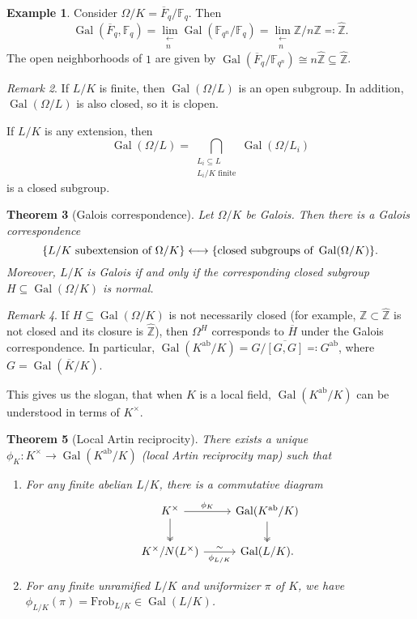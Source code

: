 \documentclass[leqno, openany]{memoir}
\newtheorem{thm}{Theorem}[section]
\theoremstyle{definition}
\newtheorem{exm}[thm]{Example}
\theoremstyle{remark}
\newtheorem{rmk}[thm]{Remark}
\theoremstyle{plain}
\theoremstyle{definition}
\theoremstyle{remark}
\newcommand{\F}{\mathbb{F}}
\newcommand{\Z}{\mathbb{Z}}
\newcommand{\mr}[1]{\mathrm{#1}}
\newcommand{\ol}[1]{\overline{#1}}
\newcommand{\wh}[1]{\widehat{#1}}
\DeclareMathOperator{\Gal}{Gal}
\begin{document}
\begin{exm} Consider $\Omega / K = \ol{F}_q / \F_q$. Then \[ \Gal(\ol{F}_q,
\F_q) = \lim_{\substack{\longleftarrow \\ n}} \Gal(\F_{q^n} / \F_q) =
\lim_{\substack{\longleftarrow \\ n}} \Z/n\Z \eqqcolon \wh{\Z}. \] The open
neighborhoods of $1$ are given by $\Gal(\ol{F}_q / \F_{q^n}) \cong n \wh{\Z}
\subseteq \wh{\Z}$.  \end{exm}

\begin{rmk} If $L/K$ is finite, then $\Gal(\Omega / L)$ is an open subgroup. In
    addition, $\Gal(\Omega / L)$ is also closed, so it is clopen.

    If $L/K$ is any extension, then \[ \Gal(\Omega / L) =
    \bigcap_{\substack{L_i \subseteq L \\ L_i/K \text{ finite}}} \Gal(\Omega /
L_i) \] is a closed subgroup.  \end{rmk}

\begin{thm}[Galois correspondence] Let $\Omega / K$ be Galois. Then there is a
    Galois correspondence \[ \qty{L/K \text{ subextension of }\Omega /K}
    \longleftrightarrow \qty{\text{closed subgroups of } \Gal(\Omega/K)}. \]
    Moreover, $L/K$ is Galois if and only if the corresponding closed subgroup
    $H \subseteq \Gal(\Omega /K)$ is normal.  \end{thm}

\begin{rmk} If $H \subseteq \Gal(\Omega /K)$ is not necessarily closed (for
    example, $\Z \subset \wh{\Z}$ is not closed and its closure is $\wh{\Z}$),
    then $\Omega^H$ corresponds to $\ol{H}$ under the Galois correspondence. In
    particular, $\Gal(K^{\mr{ab}}/K) = G/\ol{[G,G]} \eqqcolon G^{\mr{ab}}$,
    where $G = \Gal(\ol{K} / K)$.

    This gives us the slogan, that when $K$ is a local field,
$\Gal(K^{\mr{ab}}/K)$ can be understood in terms of $K^{\times}$.  \end{rmk}

\begin{thm}[Local Artin reciprocity] There exists a unique $\phi_K \colon
    K^{\times} \to \Gal(K^{\mr{ab}}/K)$ (local Artin reciprocity map) such that
    \begin{enumerate} \item For any finite abelian $L/K$, there is a
        commutative diagram \begin{equation*} \begin{tikzcd} K^{\times}
            \arrow{r}{\phi_K} \arrow[twoheadrightarrow]{d} &
            \Gal(K^{\mr{ab}}/K) \arrow[twoheadrightarrow]{d} \\ K^{\times} /
            N(L^{\times}) \arrow{r}{\sim}[swap]{\phi_{L/K}} & \Gal(L/K).
    \end{tikzcd} \end{equation*} \item For any finite unramified $L/K$ and
    uniformizer $\pi$ of $K$, we have $\phi_{L/K}(\pi) = \mr{Frob}_{L/K} \in
    \Gal(L/K)$.  \end{enumerate} \end{thm}
\end{document}
